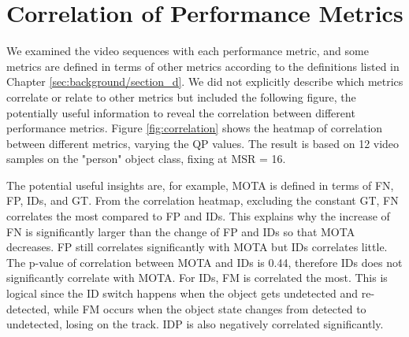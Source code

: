 \section{Correlation of Performance Metrics}
\label{sec:appendix/section_c}

We examined the video sequences with each performance metric, and some metrics are defined in terms of other metrics according to the definitions listed in Chapter \ref{sec:background/section_d}. We did not explicitly describe which metrics correlate or relate to other metrics but included the following figure, the potentially useful information to reveal the correlation between different performance metrics. Figure \ref{fig:correlation} shows the heatmap of correlation between different metrics, varying the QP values. The result is based on 12 video samples on the "person" object class, fixing at MSR = 16.

The potential useful insights are, for example, MOTA is defined in terms of FN, FP, IDs, and GT. From the correlation heatmap, excluding the constant GT, FN correlates the most compared to FP and IDs. This explains why the increase of FN is significantly larger than the change of FP and IDs so that MOTA decreases. FP still correlates significantly with MOTA but IDs correlates little. The p-value of correlation between MOTA and IDs is 0.44, therefore IDs does not significantly correlate with MOTA. For IDs, FM is correlated the most. This is logical since the ID switch happens when the object gets undetected and re-detected, while FM occurs when the object state changes from detected to undetected, losing on the track. IDP is also negatively correlated significantly.
